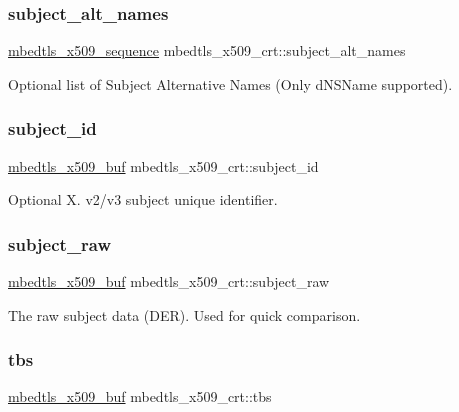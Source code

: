 \subsubsection{\texorpdfstring{subject\+\_\+alt\+\_\+names}{subject\_alt\_names}}
{\footnotesize\ttfamily \hyperlink{group__x509__module_gabd52d60a09315854d9ef849d02154f35}{mbedtls\+\_\+x509\+\_\+sequence} mbedtls\+\_\+x509\+\_\+crt\+::subject\+\_\+alt\+\_\+names}

Optional list of Subject Alternative Names (Only d\+N\+S\+Name supported). \mbox{\label{structmbedtls__x509__crt_adbbaba207a103a73f41b4b72ffc540f5}} 
\subsubsection{\texorpdfstring{subject\+\_\+id}{subject\_id}}
{\footnotesize\ttfamily \hyperlink{group__x509__module_ga4d02c9e8e4e2934555e0d132cd2976dc}{mbedtls\+\_\+x509\+\_\+buf} mbedtls\+\_\+x509\+\_\+crt\+::subject\+\_\+id}

Optional X. v2/v3 subject unique identifier. \mbox{\label{structmbedtls__x509__crt_ac30aeab20c2cdf74dae631d6d0691651}} 
\subsubsection{\texorpdfstring{subject\+\_\+raw}{subject\_raw}}
{\footnotesize\ttfamily \hyperlink{group__x509__module_ga4d02c9e8e4e2934555e0d132cd2976dc}{mbedtls\+\_\+x509\+\_\+buf} mbedtls\+\_\+x509\+\_\+crt\+::subject\+\_\+raw}

The raw subject data (D\+ER). Used for quick comparison. \mbox{\label{structmbedtls__x509__crt_a44e9a884baad5737ef0930af94ca3f94}} 
\subsubsection{\texorpdfstring{tbs}{tbs}}
{\footnotesize\ttfamily \hyperlink{group__x509__module_ga4d02c9e8e4e2934555e0d132cd2976dc}{mbedtls\+\_\+x509\+\_\+buf} mbedtls\+\_\+x509\+\_\+crt\+::tbs}


